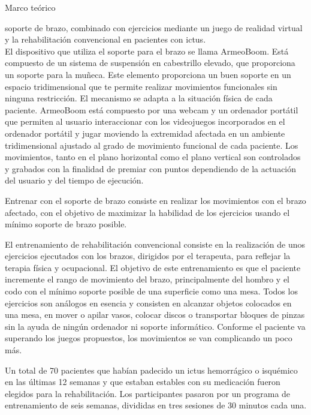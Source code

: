 \begin{thesischapter}{1} {Marco teórico}
\begin{itemize}
        soporte de brazo, combinado con ejercicios mediante un juego de realidad virtual y la rehabilitación
        convencional en pacientes con ictus.\\
        El dispositivo que utiliza el soporte para el brazo se llama ArmeoBoom. Está compuesto de
        un sistema de suspensión en cabestrillo elevado, que proporciona un soporte para la
        muñeca. Este elemento proporciona un buen soporte en un espacio tridimensional
        que te permite realizar movimientos funcionales sin ninguna restricción. El mecanismo se
        adapta a la situación física de cada paciente. ArmeoBoom está compuesto por una webcam
        y un ordenador portátil que permiten al usuario interaccionar con los videojuegos
        incorporados en el ordenador portátil y jugar moviendo la extremidad afectada en un
        ambiente tridimensional ajustado al grado de movimiento funcional de cada paciente.
        Los movimientos, tanto en el plano horizontal como el plano vertical son controlados y
        grabados con la finalidad de premiar con puntos dependiendo de la actuación del usuario
        y del tiempo de ejecución.
        
        \vspace{2pt}
        Entrenar con el soporte de brazo consiste en realizar los movimientos con el brazo
        afectado, con el objetivo de maximizar la habilidad de los ejercicios usando el mínimo
        soporte de brazo posible.
        
        \vspace{2pt}
        El entrenamiento de rehabilitación convencional consiste en la realización de unos
        ejercicios ejecutados con los brazos, dirigidos por el terapeuta, para reflejar la terapia física
        y ocupacional.
        El objetivo de este entrenamiento es que el paciente incremente el rango de movimiento
        del brazo, principalmente del hombro y el codo con el mínimo soporte posible de una
        superficie como una mesa. Todos los ejercicios son análogos en esencia y consisten en alcanzar 
        objetos colocados en una mesa, en mover o apilar vasos, colocar discos o transportar bloques de 
        pinzas sin la ayuda de ningún ordenador ni soporte informático. Conforme el paciente va superando los juegos
        propuestos, los movimientos se van complicando un poco más.

        \vspace{2pt}
        Un total de 70 pacientes que habían padecido un ictus hemorrágico o isquémico en las
        últimas 12 semanas y que estaban estables con su medicación fueron elegidos para la
        rehabilitación. Los participantes pasaron por un programa de entrenamiento de seis
        semanas, divididas en tres sesiones de 30 minutos cada una.
        

\end{itemize}
\end{thesischapter}
